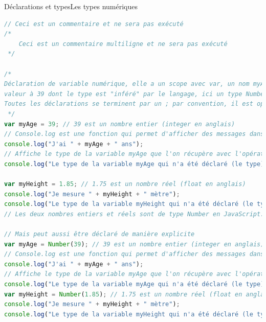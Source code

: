\documentclass{beamer}
\begin{document}
    \begin{frame}[fragile]{Déclarations et types}{Les types numériques}
        \begin{lstlisting}[language=JavaScript,basicstyle=\tiny\ttfamily]
// Ceci est un commentaire et ne sera pas exécuté
/*
    Ceci est un commentaire multiligne et ne sera pas exécuté
 */

/*
Déclaration de variable numérique, elle a un scope avec var, un nom myAge et une
valeur à 39 dont le type est "inféré" par le langage, ici un type Number.
Toutes les déclarations se terminent par un ; par convention, il est optionnel.
 */
var myAge = 39; // 39 est un nombre entier (integer en anglais)
// Console.log est une fonction qui permet d'afficher des messages dans la console
console.log("J'ai " + myAge + " ans");
// Affiche le type de la variable myAge que l'on récupère avec l'opérateur typeof
console.log("Le type de la variable myAge qui n'a été déclaré (le type) est " + typeof myAge);

var myHeight = 1.85; // 1.75 est un nombre réel (float en anglais)
console.log("Je mesure " + myHeight + " mètre");
console.log("Le type de la variable myHeight qui n'a été déclaré (le type) est " + typeof myHeight);
// Les deux nombres entiers et réels sont de type Number en JavaScript.

// Mais peut aussi être déclaré de manière explicite
var myAge = Number(39); // 39 est un nombre entier (integer en anglais)
// Console.log est une fonction qui permet d'afficher des messages dans la console
console.log("J'ai " + myAge + " ans");
// Affiche le type de la variable myAge que l'on récupère avec l'opérateur typeof
console.log("Le type de la variable myAge qui n'a été déclaré (le type) est " + typeof myAge);
var myHeight = Number(1.85); // 1.75 est un nombre réel (float en anglais)
console.log("Je mesure " + myHeight + " mètre");
console.log("Le type de la variable myHeight qui n'a été déclaré (le type) est " + typeof myHeight);
        \end{lstlisting}
    \end{frame}
\end{document}
